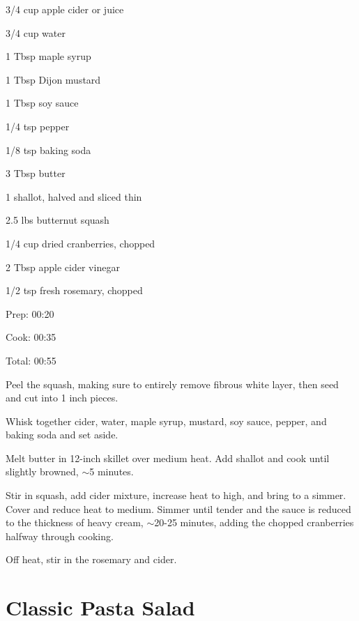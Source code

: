 \documentclass[oneside]{book}  %
\def\thisrecipe{}  %
\newcommand{\recipe}[1]{\section{#1}\def\thisrecipe{: #1}} %
\newcommand{\about}{$\sim$}
\begin{document}
\begin{IT}
  \begin{ingredients}
    \item[3/4 cup] apple cider or juice
    \item[3/4 cup] water
    \item[1 Tbsp] maple syrup
    \item[1 Tbsp] Dijon mustard
    \item[1 Tbsp] soy sauce
    \item[1/4 tsp] pepper
    \item[1/8 tsp] baking soda
    \item[3 Tbsp] butter
    \item[1] shallot, halved and sliced thin
    \item[2.5 lbs] butternut squash
    \item[1/4 cup] dried cranberries, chopped
    \item[2 Tbsp] apple cider vinegar
    \item[1/2 tsp] fresh rosemary, chopped
  \end{ingredients}

  \switchcolumn

  \begin{timeline}
    \item[Prep:]  00:20
    \item[Cook:]  00:35
    \item[Total:] 00:55
  \end{timeline}
\end{IT}

\begin{directions}
  \item Peel the squash, making sure to entirely remove fibrous white layer,
  then seed and cut into 1 inch pieces.

  \item Whisk together cider, water, maple syrup, mustard, soy sauce, pepper,
  and baking soda and set aside.

  \item Melt butter in 12-inch skillet over medium heat. Add shallot and cook
  until slightly browned, \about 5 minutes.

  \item Stir in squash, add cider mixture, increase heat to high, and bring to a
  simmer. Cover and reduce heat to medium. Simmer until tender and the sauce is
  reduced to the thickness of heavy cream, \about 20-25 minutes, adding the
  chopped cranberries halfway through cooking.

  \item Off heat, stir in the rosemary and cider.
\end{directions}
\recipe{Classic Pasta Salad} \label{recipe:classic_pasta_salad} %
 
\end{document}
